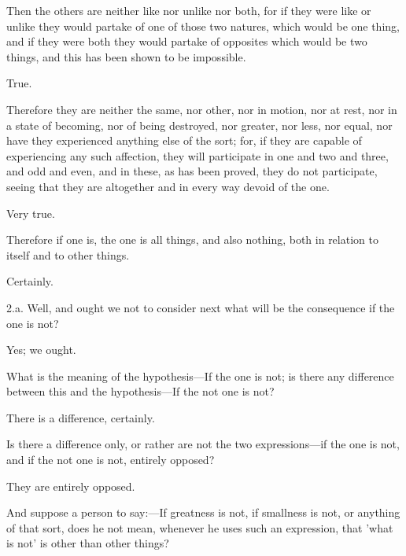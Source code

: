 \documentclass[11pt,letter]{article}
\begin{document}
\par  Then the others are neither like nor unlike nor both, for if they were like or unlike they would partake of one of those two natures, which would be one thing, and if they were both they would partake of opposites which would be two things, and this has been shown to be impossible.

\par  True.

\par  Therefore they are neither the same, nor other, nor in motion, nor at rest, nor in a state of becoming, nor of being destroyed, nor greater, nor less, nor equal, nor have they experienced anything else of the sort; for, if they are capable of experiencing any such affection, they will participate in one and two and three, and odd and even, and in these, as has been proved, they do not participate, seeing that they are altogether and in every way devoid of the one.

\par  Very true.

\par  Therefore if one is, the one is all things, and also nothing, both in relation to itself and to other things.

\par  Certainly.

\par  2.a. Well, and ought we not to consider next what will be the consequence if the one is not?

\par  Yes; we ought.

\par  What is the meaning of the hypothesis—If the one is not; is there any difference between this and the hypothesis—If the not one is not?

\par  There is a difference, certainly.

\par  Is there a difference only, or rather are not the two expressions—if the one is not, and if the not one is not, entirely opposed?

\par  They are entirely opposed.

\par  And suppose a person to say:—If greatness is not, if smallness is not, or anything of that sort, does he not mean, whenever he uses such an expression, that 'what is not' is other than other things?
\end{document}

